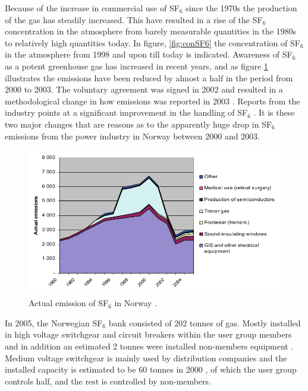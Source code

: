 \documentclass[10pt,a4paper,twoside]{article}
\begin{document}
Because of the increase in commercial use of SF$_6$ since the 1970s the production of the gas has steadily increased. This have resulted in a rise of the SF$_6$ concentration in the atmosphere from barely measurable quantities in the 1980s \cite{bib:SF6PI} to relatively high quantities today. In figure, \ref{fig:conSF6} the concentration of SF$_6$ in the atmosphere from 1998 and upon till today is indicated. Awareness of SF$_6$ as a potent greenhouse gas has increased in recent years, and as figure \ref{fig:SF6EmissNor} illustrates the emissions have been reduced by almost a half in the period from 2000 to 2003. The voluntary agreement was signed in 2002 and resulted in a methodological change in how emissions was reported in 2003 \cite{bib:regSF6Miljo}. Reports from the industry points at a significant improvement in the handling of SF$_6$ \cite{bib:StatSF6}. It is these two major changes that are reasons as to the apparently huge drop in SF$_6$ emissions from the power industry in Norway between 2000 and 2003.

\begin{figure}[H]
\centering
\includegraphics[scale=0.6]{Bilder/Theory/emissionsSF6Norway.png}
\caption{Actual emission of SF$_6$ in Norway \cite{bib:StatSF6}.} \label{fig:SF6EmissNor}
\end{figure}

In 2005, the Norwegian SF$_6$ bank consisted of 202 tonnes of gas. Mostly installed in high voltage switchgear and circuit breakers within the user group members and in addition an estimated 2 tonnes were installed non-members equipment \cite{bib:StatSF6}. Medium voltage switchgear is mainly used by distribution companies and the installed capacity is estimated to be 60 tonnes in 2000 \cite{bib:StatSF6}, of which the user group controls half, and the rest is controlled by non-members.
\end{document}
